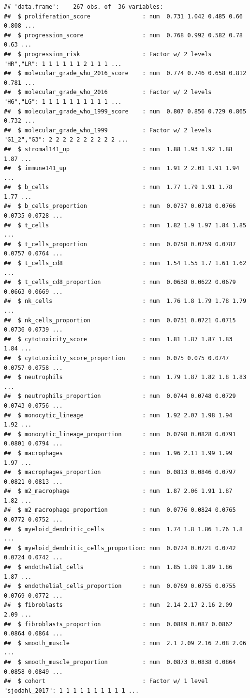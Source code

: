 \documentclass[
]{article}
\begin{document}
\begin{verbatim}
## 'data.frame':    267 obs. of  36 variables:
##  $ proliferation_score               : num  0.731 1.042 0.485 0.66 0.808 ...
##  $ progression_score                 : num  0.768 0.992 0.582 0.78 0.63 ...
##  $ progression_risk                  : Factor w/ 2 levels "HR","LR": 1 1 1 1 1 1 2 1 1 1 ...
##  $ molecular_grade_who_2016_score    : num  0.774 0.746 0.658 0.812 0.781 ...
##  $ molecular_grade_who_2016          : Factor w/ 2 levels "HG","LG": 1 1 1 1 1 1 1 1 1 1 ...
##  $ molecular_grade_who_1999_score    : num  0.807 0.856 0.729 0.865 0.732 ...
##  $ molecular_grade_who_1999          : Factor w/ 2 levels "G1_2","G3": 2 2 2 2 2 2 2 2 2 2 ...
##  $ stromal141_up                     : num  1.88 1.93 1.92 1.88 1.87 ...
##  $ immune141_up                      : num  1.91 2 2.01 1.91 1.94 ...
##  $ b_cells                           : num  1.77 1.79 1.91 1.78 1.77 ...
##  $ b_cells_proportion                : num  0.0737 0.0718 0.0766 0.0735 0.0728 ...
##  $ t_cells                           : num  1.82 1.9 1.97 1.84 1.85 ...
##  $ t_cells_proportion                : num  0.0758 0.0759 0.0787 0.0757 0.0764 ...
##  $ t_cells_cd8                       : num  1.54 1.55 1.7 1.61 1.62 ...
##  $ t_cells_cd8_proportion            : num  0.0638 0.0622 0.0679 0.0663 0.0669 ...
##  $ nk_cells                          : num  1.76 1.8 1.79 1.78 1.79 ...
##  $ nk_cells_proportion               : num  0.0731 0.0721 0.0715 0.0736 0.0739 ...
##  $ cytotoxicity_score                : num  1.81 1.87 1.87 1.83 1.84 ...
##  $ cytotoxicity_score_proportion     : num  0.075 0.075 0.0747 0.0757 0.0758 ...
##  $ neutrophils                       : num  1.79 1.87 1.82 1.8 1.83 ...
##  $ neutrophils_proportion            : num  0.0744 0.0748 0.0729 0.0743 0.0756 ...
##  $ monocytic_lineage                 : num  1.92 2.07 1.98 1.94 1.92 ...
##  $ monocytic_lineage_proportion      : num  0.0798 0.0828 0.0791 0.0801 0.0794 ...
##  $ macrophages                       : num  1.96 2.11 1.99 1.99 1.97 ...
##  $ macrophages_proportion            : num  0.0813 0.0846 0.0797 0.0821 0.0813 ...
##  $ m2_macrophage                     : num  1.87 2.06 1.91 1.87 1.82 ...
##  $ m2_macrophage_proportion          : num  0.0776 0.0824 0.0765 0.0772 0.0752 ...
##  $ myeloid_dendritic_cells           : num  1.74 1.8 1.86 1.76 1.8 ...
##  $ myeloid_dendritic_cells_proportion: num  0.0724 0.0721 0.0742 0.0724 0.0742 ...
##  $ endothelial_cells                 : num  1.85 1.89 1.89 1.86 1.87 ...
##  $ endothelial_cells_proportion      : num  0.0769 0.0755 0.0755 0.0769 0.0772 ...
##  $ fibroblasts                       : num  2.14 2.17 2.16 2.09 2.09 ...
##  $ fibroblasts_proportion            : num  0.0889 0.087 0.0862 0.0864 0.0864 ...
##  $ smooth_muscle                     : num  2.1 2.09 2.16 2.08 2.06 ...
##  $ smooth_muscle_proportion          : num  0.0873 0.0838 0.0864 0.0858 0.0849 ...
##  $ cohort                            : Factor w/ 1 level "sjodahl_2017": 1 1 1 1 1 1 1 1 1 1 ...
\end{verbatim}
\end{document}
